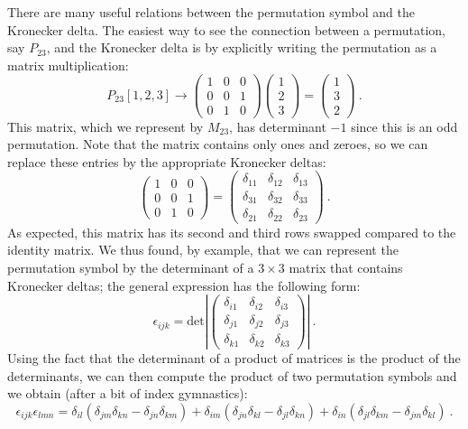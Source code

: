 There are many useful relations between the permutation symbol and the Kronecker delta. The easiest way to see the connection between a permutation, say $P_{23}$, and the Kronecker delta is by explicitly writing the permutation as a matrix multiplication:
\[
	P_{23}[1,2,3] \rightarrow \begin{pmatrix}1&0&0\\ 0&0 &1\\ 0&1&0\end{pmatrix}\begin{pmatrix}1\\ 2\\ 3\end{pmatrix}=\begin{pmatrix}1\\ 3\\ 2\end{pmatrix}\ .
\]
This matrix, which we represent by $M_{23}$, has determinant $-1$ since this is an odd permutation. Note that the matrix contains only ones and zeroes, so we can replace these entries by the appropriate Kronecker deltas:
\[
	\begin{pmatrix}1&0&0\\ 0&0 &1\\ 0&1&0\end{pmatrix} = \begin{pmatrix}\delta_{11}&\delta_{12}&\delta_{13}\\ \delta_{31}&\delta_{32} &\delta_{33}\\ \delta_{21}&\delta_{22}&\delta_{23}\end{pmatrix}\ .
\]	
As expected, this matrix has its second and third rows swapped compared to the identity matrix.  We thus found, by example, that we can represent the permutation symbol by the determinant of a $3\times 3$ matrix that contains Kronecker deltas; the general expression has the following form:
\[
	\epsilon_{ijk} = \text{det}\left\vert \begin{pmatrix}\delta_{i1}&\delta_{i2}&\delta_{i3}\\ \delta_{j1}&\delta_{j2} &\delta_{j3}\\ \delta_{k1}&\delta_{k2}&\delta_{k3}\end{pmatrix}\right\vert\ .
\]
Using the fact that the determinant of a product of matrices is the product of the determinants, we can then compute the product of two permutation symbols and we obtain (after a bit of index gymnastics):
\begin{equation}
	\epsilon_{ijk}\epsilon_{lmn} = \delta_{il}(\delta_{jm}\delta_{kn}-\delta_{jn}\delta_{km})+\delta_{im}(\delta_{jn}\delta_{kl}-\delta_{jl}\delta_{kn})+\delta_{in}(\delta_{jl}\delta_{km}-\delta_{jm}\delta_{kl})\ .
\end{equation}
